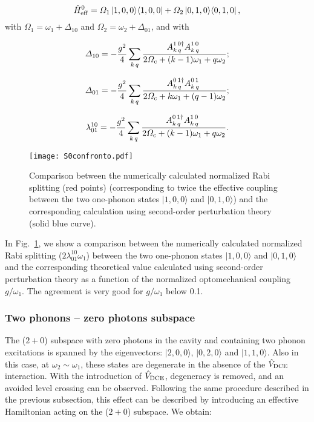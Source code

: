 \documentclass[aps,pra,twocolumn,floatfix,longbibliography, superscriptaddress]{revtex4-1}
\newcommand{\ket}[1]{|#1\rangle}
\newcommand{\ketbra}[2]{\left| #1 \rangle \langle #2 \right|}
\newcommand{\figref}[1]{\mbox{Fig.~\ref{#1}}}
\newcommand{\be}{\begin{equation}}
\newcommand{\ee}{\end{equation}}
\begin{document}
\be
\hat H_{\rm eff}^0= \Omega_1 \ketbra{1,0,0}{1,0,0}
+ \Omega_2 \ketbra{0,1,0}{0,1,0},
\ee
with $\Omega_1=\omega_1+\Delta_{10}$ and $\Omega_2=\omega_2+\Delta_{01}$, and with

\be
\Delta_{10}=-\frac{ g^2}{4}\sum_{k\,q}\frac{A_{k\,q}^{ 1\,0\dag} A_{k\,q}^{ 1\,0\phantom{\dag}}}{2\Omega_{\rm c}+(k-1)\omega_1+q\omega_2};
\ee	

\be
\Delta_{01}=-\frac{ g^2}{4}\sum_{k\,q}\frac{A_{k\,q}^{0\,1\dag } A_{k\,q}^{ 0\,1\phantom{\dag}}}{2\Omega_{\rm c}+k\omega_1+(q-1)\omega_2};
\ee	


\be
\lambda^{10}_{01}=-\frac{ g^2}{4}\sum_{k\,q}\frac{A_{k\,q}^{ 0\,1\dag} A_{k\,q}^{1\,0\phantom{\dag}}}{2\Omega_{\rm c}+(k-1)\omega_1+q\omega_2}.
\ee	
\begin{figure}
	\texttt{[image: S0confronto.pdf]}
	\caption{Comparison between the numerically calculated normalized Rabi splitting (red points)  (corresponding to twice the effective coupling between the two one-phonon states $\ket {1,0,0}$ and $\ket{0,1,0}$) and the corresponding calculation using second-order perturbation theory (solid blue curve).
	}\label{Fig2}
\end{figure}
In \figref{Fig2}, we show a comparison between the numerically calculated normalized Rabi splitting ($2\lambda_{01}^{10} \omega_1$) between the two one-phonon states $\ket {1,0,0}$ and $\ket{0,1,0}$ and the corresponding theoretical value calculated using second-order perturbation theory  
as a function of the normalized optomechanical
coupling $g/\omega_1$. The agreement is very good for $g/\omega_1$ below 0.1.



\subsubsection{Two phonons -- zero photons subspace}
The ($2+0$) subspace with zero photons in the cavity and containing two phonon excitations is spanned by the eigenvectors: $\ket{2,0,0}$, $\ket{0,2,0}$ and $\ket{1,1,0}$.
Also in this case, at $\omega_2\sim \omega_1$, these states are degenerate in the absence of the $\hat V_{\rm DCE}$ interaction. With the introduction of $\hat V_{\rm DCE}$, degeneracy is removed, and an avoided level crossing can be observed. Following the same procedure described  in the previous subsection, this effect can be described by introducing an effective Hamiltonian acting on the ($2+0$) subspace. We obtain:
\end{document}
